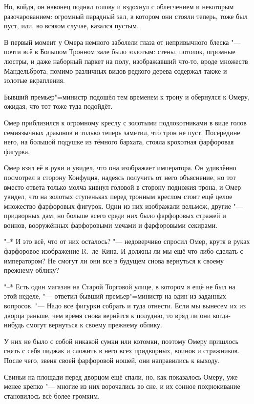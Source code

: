 Но, войдя, он наконец поднял голову и вздохнул с облегчением и некоторым
разочарованием: огромный парадный зал, в котором они стояли теперь, тоже был
пуст, или, во всяком случае, казался пустым.

В первый момент у Омера немного заболели глаза от непривычного блеска "---
почти всё в Большом Тронном зале было золотым: стены, потолок, огромные люстры,
и даже наборный паркет на полу, изображавший что-то, вроде множеств
Мандельброта, помимо различных видов редкого дерева содержал также и золотые
вкрапления.

Бывший премьер"=министр подошёл тем временем к трону и обернулся к Омеру,
ожидая, что тот тоже туда подойдёт.

Омер приблизился к огромному креслу с золотыми подлокотниками в виде голов
семиязычных драконов и только теперь заметил, что трон не пуст.
Посередине него, на большой подушке из тёмного бархата, стояла крохотная
фарфоровая фигурка.

Омер взял её в руки и увидел, что она изображает императора.
Он удивлённо посмотрел в сторону Конфуция, надеясь получить от него объяснение,
но тот вместо ответа только молча кивнул головой в сторону подножия трона, и
Омер увидел, что на золотых ступеньках перед тронным креслом стоит ещё целое
множество фарфоровых фигурок.
Одни из них изображали вельмож, другие "--- придворных дам, но больше всего
среди них было фарфоровых стражей и воинов, вооружённых фарфоровыми мечами и
фарфоровыми секирами.

"--* И это всё, что от них осталось? "--- недоверчиво спросил Омер, крутя в
руках фарфоровое изображение R.~ле~Кина.
И должны ли мы ещё что-либо сделать с императором?
Не смогут ли они все в будущем снова вернуться к своему прежнему облику?

"--* Есть один магазин на Старой Торговой улице, в котором я ещё не был на этой
неделе, "--- ответил бывший премьер"=министр на один из заданных вопросов.
"--- Надо все фигурки собрать и туда отнести.
Если мы вынесем их из дворца раньше, чем время снова вернётся к полудню, то вряд
ли они когда-нибудь смогут вернуться к своему прежнему облику.

У них не было с собой никакой сумки или котомки, поэтому Омеру пришлось снять с
себя пиджак и сложить в него всех придворных, воинов и стражников.
После чего, звеня своей фарфоровой ношей, они направились к выходу.

Свиньи на площади перед дворцом ещё спали, но, как показалось Омеру, уже менее
крепко "--- многие из них ворочались во сне, и их сонное похрюкивание
становилось всё более громким.

